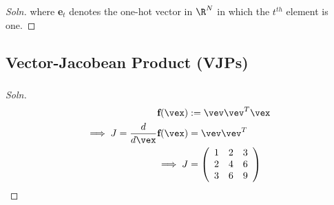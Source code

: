 \documentclass{article}
\begin{document}
\begin{proof}[Soln]
		where \textbf{e}$_t$ denotes the one-hot vector in $\R^N$ in which the $t^{th}$ element is one.
	\end{proof}
	\subsection{Vector-Jacobean Product (VJPs)}
	\subsubsection{}
	\begin{proof}[Soln]
		\begin{align}
			\textbf{f}(\vex) &:= \vev \vev^T \vex \\
			\implies J = \frac{d}{d\vex} \textbf{f}(\vex) &= \vev \vev^T \\
			\implies J &=
			\left(
			\begin{array}{ccc}
			 1 & 2 & 3 \\
			 2 & 4 & 6 \\
			 3 & 6 & 9 \\
			\end{array}
			\right)
		\end{align}
	\end{proof}
	
\end{document}
